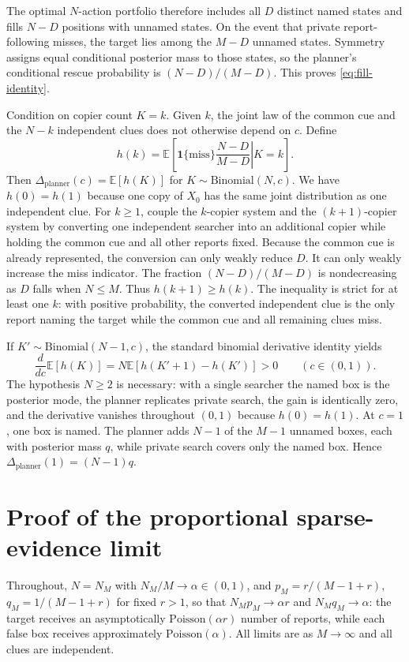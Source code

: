 \documentclass[11pt]{article}
\theoremstyle{definition}
\theoremstyle{remark}
\newcommand{\E}{\mathbb{E}}
\newcommand{\1}{\mathbf{1}}
\newcommand{\plan}{\mathrm{planner}}
\begin{document}
The optimal $N$-action portfolio therefore includes all $D$ distinct named states and fills $N-D$ positions with unnamed states. On the event that private report-following misses, the target lies among the $M-D$ unnamed states. Symmetry assigns equal conditional posterior mass to those states, so the planner's conditional rescue probability is $(N-D)/(M-D)$. This proves \cref{eq:fill-identity}.

Condition on copier count $K=k$. Given $k$, the joint law of the common cue and the $N-k$ independent clues does not otherwise depend on $c$. Define
\[
h(k)=\E\left[\left.\1\{\text{miss}\}\frac{N-D}{M-D}\right|K=k\right].
\]
Then $\Delta_{\plan}(c)=\E[h(K)]$ for $K\sim\mathrm{Binomial}(N,c)$. We have $h(0)=h(1)$ because one copy of $X_0$ has the same joint distribution as one independent clue. For $k\ge1$, couple the $k$-copier system and the $(k+1)$-copier system by converting one independent searcher into an additional copier while holding the common cue and all other reports fixed. Because the common cue is already represented, the conversion can only weakly reduce $D$. It can only weakly increase the miss indicator. The fraction $(N-D)/(M-D)$ is nondecreasing as $D$ falls when $N\le M$. Thus $h(k+1)\ge h(k)$. The inequality is strict for at least one $k$: with positive probability, the converted independent clue is the only report naming the target while the common cue and all remaining clues miss.

If $K'\sim\mathrm{Binomial}(N-1,c)$, the standard binomial derivative identity yields
\[
\frac{d}{dc}\E[h(K)]
=N\E[h(K'+1)-h(K')]>0
\qquad(c\in(0,1)).
\]
The hypothesis $N\ge2$ is necessary: with a single searcher the named box is the posterior mode, the planner replicates private search, the gain is identically zero, and the derivative vanishes throughout $(0,1)$ because $h(0)=h(1)$.
At $c=1$, one box is named. The planner adds $N-1$ of the $M-1$ unnamed boxes, each with posterior mass $q$, while private search covers only the named box. Hence $\Delta_{\plan}(1)=(N-1)q$.

\section{Proof of the proportional sparse-evidence limit}
\label{app:scaling}

Throughout, $N=N_M$ with $N_M/M\to\alpha\in(0,1)$, and $p_M=r/(M-1+r)$, $q_M=1/(M-1+r)$ for fixed $r>1$, so that $N_Mp_M\to\alpha r$ and $N_Mq_M\to\alpha$: the target receives an asymptotically $\mathrm{Poisson}(\alpha r)$ number of reports, while each false box receives approximately $\mathrm{Poisson}(\alpha)$. All limits are as $M\to\infty$ and all clues are independent.
\end{document}
